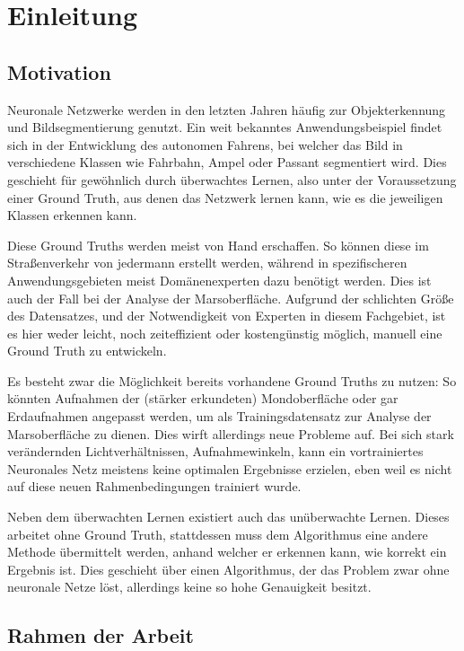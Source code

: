\chapter{Einleitung}
\label{chap:einleitung}

\section{Motivation}
\label{sec:motivation}

Neuronale Netzwerke werden in den letzten Jahren häufig zur Objekterkennung und Bildsegmentierung genutzt. Ein weit bekanntes Anwendungsbeispiel findet sich in der Entwicklung des autonomen Fahrens, bei welcher das Bild in verschiedene Klassen wie \zB Fahrbahn, Ampel oder Passant segmentiert wird. Dies geschieht für gewöhnlich durch überwachtes Lernen, also unter der Voraussetzung einer Ground Truth, aus denen das Netzwerk lernen kann, wie es die jeweiligen Klassen erkennen kann.

Diese Ground Truths werden meist von Hand erschaffen. So können diese im Straßenverkehr von jedermann erstellt werden, während in spezifischeren Anwendungsgebieten meist Domänenexperten dazu benötigt werden. Dies ist auch der Fall bei der Analyse der Marsoberfläche. Aufgrund der schlichten Größe des Datensatzes, und der Notwendigkeit von Experten in diesem Fachgebiet, ist es hier weder leicht, noch zeiteffizient oder kostengünstig möglich, manuell eine Ground Truth zu entwickeln.

Es besteht zwar die Möglichkeit bereits vorhandene Ground Truths zu nutzen: So könnten \bspw Aufnahmen der (stärker erkundeten) Mondoberfläche oder gar Erdaufnahmen angepasst werden, um als Trainingsdatensatz zur Analyse der Marsoberfläche zu dienen. Dies wirft allerdings neue Probleme auf. Bei \bspw sich stark verändernden Lichtverhältnissen, Aufnahmewinkeln, \oa kann ein vortrainiertes Neuronales Netz meistens keine optimalen Ergebnisse erzielen, eben weil es nicht auf diese neuen Rahmenbedingungen trainiert wurde.

Neben dem überwachten Lernen existiert auch das unüberwachte Lernen. Dieses arbeitet ohne Ground Truth, stattdessen muss dem Algorithmus eine andere Methode übermittelt werden, anhand welcher er erkennen kann, wie korrekt ein Ergebnis ist. Dies geschieht \zB über einen Algorithmus, der das Problem zwar ohne neuronale Netze löst, allerdings keine so hohe Genauigkeit besitzt.

\section{Rahmen der Arbeit}
\label{sec:rahmen}

